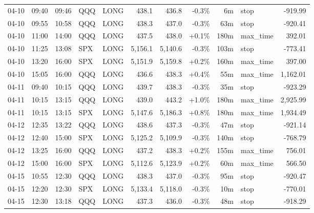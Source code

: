 \documentclass[11pt,a4paper,twoside]{article}
\begin{document}
\begin{center}
\begin{longtable}{>{\color{txtmain}}l l l l l r r r r >{\color{txtmain}}l r}
04-10 & 09:40 & 09:46 & QQQ & LONG & 438.1 & 436.8 & \textcolor{lossred}{-0.3\%} & 6m & stop & \textcolor{lossred}{-919.99} \\
04-10 & 09:55 & 10:58 & QQQ & LONG & 438.3 & 437.0 & \textcolor{lossred}{-0.3\%} & 63m & stop & \textcolor{lossred}{-920.41} \\
04-10 & 11:00 & 14:00 & QQQ & LONG & 437.5 & 438.0 & \textcolor{wingreen}{+0.1\%} & 180m & max\_time & \textcolor{wingreen}{392.01} \\
04-10 & 11:25 & 13:08 & SPX & LONG & 5,156.1 & 5,140.6 & \textcolor{lossred}{-0.3\%} & 103m & stop & \textcolor{lossred}{-773.41} \\
04-10 & 13:20 & 16:00 & SPX & LONG & 5,151.9 & 5,159.8 & \textcolor{wingreen}{+0.2\%} & 160m & max\_time & \textcolor{wingreen}{397.00} \\
04-10 & 15:05 & 16:00 & QQQ & LONG & 436.6 & 438.3 & \textcolor{wingreen}{+0.4\%} & 55m & max\_time & \textcolor{wingreen}{1,162.01} \\
04-11 & 09:40 & 10:15 & QQQ & LONG & 439.7 & 438.3 & \textcolor{lossred}{-0.3\%} & 35m & stop & \textcolor{lossred}{-923.29} \\
04-11 & 10:15 & 13:15 & QQQ & LONG & 439.0 & 443.2 & \textcolor{wingreen}{+1.0\%} & 180m & max\_time & \textcolor{wingreen}{2,925.99} \\
04-11 & 10:15 & 13:15 & SPX & LONG & 5,147.6 & 5,186.3 & \textcolor{wingreen}{+0.8\%} & 180m & max\_time & \textcolor{wingreen}{1,934.49} \\
04-12 & 12:35 & 13:22 & QQQ & LONG & 438.6 & 437.3 & \textcolor{lossred}{-0.3\%} & 47m & stop & \textcolor{lossred}{-921.14} \\
04-12 & 12:40 & 15:00 & SPX & LONG & 5,125.2 & 5,109.9 & \textcolor{lossred}{-0.3\%} & 140m & stop & \textcolor{lossred}{-768.79} \\
04-12 & 13:25 & 16:00 & QQQ & LONG & 437.2 & 438.3 & \textcolor{wingreen}{+0.2\%} & 155m & max\_time & \textcolor{wingreen}{756.01} \\
04-12 & 15:00 & 16:00 & SPX & LONG & 5,112.6 & 5,123.9 & \textcolor{wingreen}{+0.2\%} & 60m & max\_time & \textcolor{wingreen}{566.50} \\
04-15 & 10:55 & 12:30 & QQQ & LONG & 438.3 & 437.0 & \textcolor{lossred}{-0.3\%} & 95m & stop & \textcolor{lossred}{-920.47} \\
04-15 & 12:20 & 12:30 & SPX & LONG & 5,133.4 & 5,118.0 & \textcolor{lossred}{-0.3\%} & 10m & stop & \textcolor{lossred}{-770.01} \\
04-15 & 12:30 & 13:18 & QQQ & LONG & 437.3 & 436.0 & \textcolor{lossred}{-0.3\%} & 48m & stop & \textcolor{lossred}{-918.29} \\

\end{longtable}
\end{center}
\end{document}
